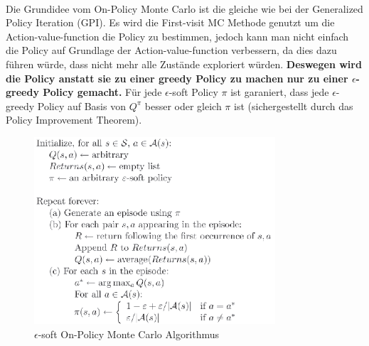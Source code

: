\documentclass[10pt]{scrartcl}
\begin{document}
\\
Die Grundidee vom On-Policy Monte Carlo ist die gleiche wie bei der Generalized Policy Iteration (GPI). Es wird die First-visit MC Methode genutzt um die Action-value-function die Policy zu bestimmen, jedoch kann man nicht einfach die Policy auf Grundlage der Action-value-function verbessern, da dies dazu führen würde, dass nicht mehr alle Zustände exploriert würden. \textbf{Deswegen wird die Policy anstatt sie zu einer greedy Policy zu machen nur zu einer $\epsilon$-greedy Policy gemacht.} Für jede $\epsilon$-soft Policy $\pi$ ist garaniert, dass jede $\epsilon$-greedy Policy auf Basis von $Q^{\pi}$ besser oder gleich $\pi$ ist (sichergestellt durch das Policy Improvement Theorem).

\begin{figure}[htbp]
	\centering	\includegraphics[width=0.8\textwidth]{Bilder/MC_OnPolicy.png}
	\caption{$\epsilon$-soft On-Policy Monte Carlo Algorithmus}
	\label{fig:MC_OnPolicy}
\end{figure}
\end{document}
